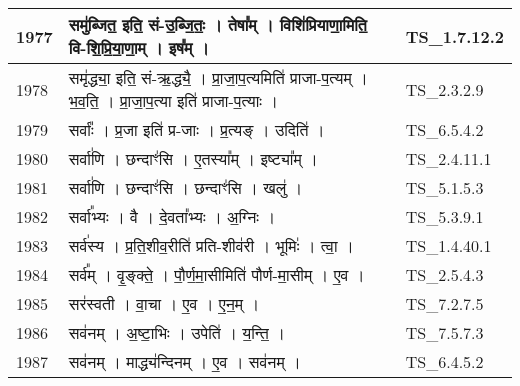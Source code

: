 \documentclass[17pt]{extarticle}
\begin{document}
\begin{longtable}{||p{0.4in}||p{4.9in}||p{0.9in}||}
    1977 & समु॑ब्जित॒ इति॒ सं{-}उ॒ब्जि॒तः॒   ।   तेषा᳚म्   ।   विशि॑प्रियाणा॒मिति॒ वि{-}शि॒प्रि॒या॒णा॒म्   ।   इष᳚म्   ।    & TS\_1.7.12.2       \\
    
    \hline
        
    1978 & समृ॑द्ध्या॒ इति॒ सं{-}ऋ॒द्ध्यै॒   ।   प्रा॒जा॒प॒त्यमिति॑ प्राजा{-}प॒त्यम्   ।   भ॒व॒ति॒   ।   प्रा॒जा॒प॒त्या इति॑ प्राजा{-}प॒त्याः   ।    & TS\_2.3.2.9       \\
    
    \hline
        
    1979 & सर्वाः᳚   ।   प्र॒जा इति॑ प्र{-}जाः   ।   प्र॒त्यङ्   ।   उदिति॑   ।    & TS\_6.5.4.2       \\
    
    \hline
        
    1980 & सर्वा॑णि   ।   छन्दाꣳ॑सि   ।   ए॒तस्या᳚म्   ।   इष्ट्या᳚म्   ।    & TS\_2.4.11.1       \\
    
    \hline
        
    1981 & सर्वा॑णि   ।   छन्दाꣳ॑सि   ।   छन्दाꣳ॑सि   ।   खलु॑   ।    & TS\_5.1.5.3       \\
    
    \hline
        
    1982 & सर्वा᳚भ्यः   ।   वै   ।   दे॒वता᳚भ्यः   ।   अ॒ग्निः   ।    & TS\_5.3.9.1       \\
    
    \hline
        
    1983 & सर्व॑स्य   ।   प्र॒ति॒शीव॒रीति॑ प्रति{-}शीव॑री   ।   भूमिः॑   ।   त्वा॒   ।    & TS\_1.4.40.1       \\
    
    \hline
        
    1984 & सर्व᳚म्   ।   वृ॒ङ्क्ते॒   ।   पौ॒र्ण॒मा॒सीमिति॑ पौर्ण{-}मा॒सीम्   ।   ए॒व   ।    & TS\_2.5.4.3       \\
    
    \hline
        
    1985 & सर॑स्वती   ।   वा॒चा   ।   ए॒व   ।   ए॒न॒म्   ।    & TS\_7.2.7.5       \\
    
    \hline
        
    1986 & सव॑नम्   ।   अ॒ष्टा॒भिः   ।   उपेति॑   ।   य॒न्ति॒   ।    & TS\_7.5.7.3       \\
    
    \hline
        
    1987 & सव॑नम्   ।   माद्ध्य॑न्दिनम्   ।   ए॒व   ।   सव॑नम्   ।    & TS\_6.4.5.2       \\
    

\end{longtable}
\end{document}
